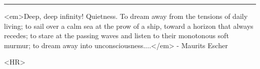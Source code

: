 \par\noindent\rule{\textwidth}{0.4pt}
<em>Deep, deep infinity!  Quietness.  To dream away from the tensions
of daily living; to sail over a calm sea at the prow of a ship, toward
a horizon that always recedes; to stare at the passing waves and listen
to their monotonous soft murmur; to dream away into unconsciousness....</em> 
- Maurits Escher

<HR>



